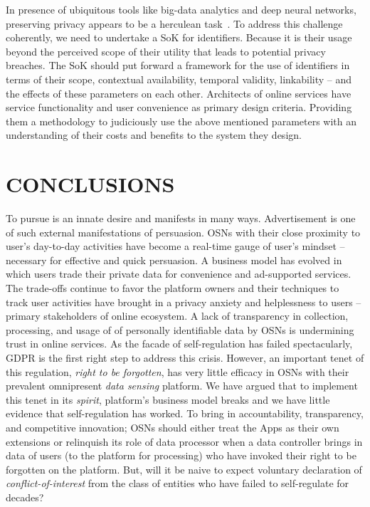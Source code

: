\documentclass[runningheads]{llncs}
\begin{document}
In presence of ubiquitous tools like big-data analytics and deep
neural networks, preserving privacy appears to be a herculean
task~\cite{unique-mall,unique-crowd}. To address this challenge
coherently, we need to undertake a SoK for identifiers. Because it is
their usage beyond the perceived scope of their utility that leads to
potential privacy breaches. The SoK should put forward a framework for
the use of identifiers in terms of their scope, contextual
availability, temporal validity, linkability -- and the effects of
these parameters on each other. Architects of online services have
service functionality and user convenience as primary design
criteria. Providing them a methodology to judiciously use the above
mentioned parameters with an understanding of their costs and benefits
to the system they design.


\section{CONCLUSIONS}
\label{sec:conclusion}
\noindent To pursue is an innate desire and manifests in many
ways. Advertisement is one of such external manifestations of
persuasion. OSNs with their close proximity to user's day-to-day
activities have become a real-time gauge of user's mindset --
necessary for effective and quick persuasion. A business model has
evolved in which users trade their private data for convenience and
ad-supported services. The trade-offs continue to favor the platform
owners and their techniques to track user activities have brought in a
privacy anxiety and helplessness to users -- primary stakeholders of
online ecosystem. A lack of transparency in collection, processing, and
usage of of personally identifiable data by OSNs is undermining trust
in online services. As the facade of self-regulation has failed
spectacularly, GDPR is the first right step to address this
crisis. However, an important tenet of this regulation, \textit{right
  to be forgotten}, has very little efficacy in OSNs with their
prevalent omnipresent \textit{data sensing} platform. We have argued
that to implement this tenet in its \textit{spirit}, platform's
business model breaks and we have little evidence that self-regulation
has worked. To bring in accountability, transparency, and competitive
innovation; OSNs should either treat the Apps as their own extensions
or relinquish its role of data processor when a data controller brings
in data of users (to the platform for processing) who have invoked
their right to be forgotten on the platform. But, will it be naive to
expect voluntary declaration of \textit{conflict-of-interest} from the
class of entities who have failed to self-regulate for decades?
\end{document}
